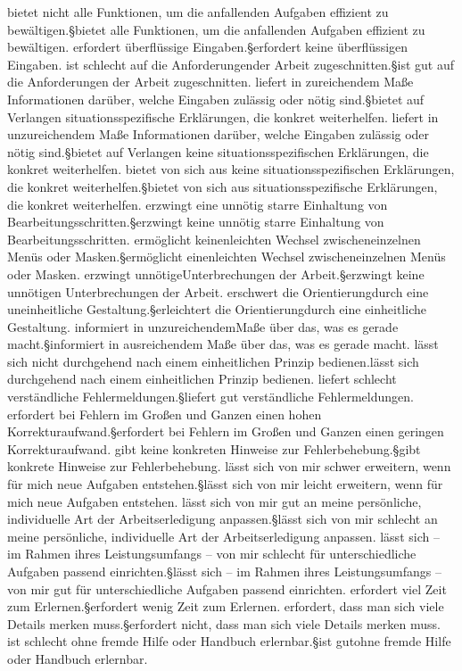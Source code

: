 bietet nicht alle Funktionen, um die anfallenden Aufgaben effizient zu bewältigen.§bietet alle Funktionen, um die anfallenden Aufgaben effizient zu bewältigen.
erfordert überflüssige Eingaben.§erfordert keine überflüssigen Eingaben.
ist schlecht auf die Anforderungender Arbeit zugeschnitten.§ist gut auf die Anforderungen der Arbeit zugeschnitten.
liefert in zureichendem Maße Informationen darüber, welche Eingaben zulässig oder nötig sind.§bietet auf Verlangen situationsspezifische Erklärungen, die konkret weiterhelfen.
liefert in unzureichendem Maße Informationen darüber, welche Eingaben zulässig oder nötig sind.§bietet auf Verlangen keine situationsspezifischen Erklärungen, die konkret weiterhelfen.
bietet von sich aus keine situationsspezifischen Erklärungen, die konkret weiterhelfen.§bietet von sich aus situationsspezifische Erklärungen, die konkret weiterhelfen.
erzwingt eine unnötig starre Einhaltung von Bearbeitungsschritten.§erzwingt keine unnötig starre Einhaltung von Bearbeitungsschritten.
ermöglicht keinenleichten Wechsel zwischeneinzelnen Menüs oder Masken.§ermöglicht einenleichten Wechsel zwischeneinzelnen Menüs oder Masken.
erzwingt unnötigeUnterbrechungen der Arbeit.§erzwingt keine unnötigen Unterbrechungen der Arbeit.
erschwert die Orientierungdurch eine uneinheitliche Gestaltung.§erleichtert die Orientierungdurch eine einheitliche Gestaltung.
informiert in unzureichendemMaße über das, was es gerade macht.§informiert in ausreichendem Maße über das, was es gerade macht.
lässt sich nicht durchgehend nach einem einheitlichen Prinzip bedienen.lässt sich durchgehend nach einem einheitlichen Prinzip bedienen.
liefert schlecht verständliche Fehlermeldungen.§liefert gut verständliche Fehlermeldungen.
erfordert bei Fehlern im Großen und Ganzen einen hohen Korrekturaufwand.§erfordert bei Fehlern im Großen und Ganzen einen geringen Korrekturaufwand.
gibt keine konkreten Hinweise zur Fehlerbehebung.§gibt konkrete Hinweise zur Fehlerbehebung.
lässt sich von mir schwer erweitern, wenn für mich neue Aufgaben entstehen.§lässt sich von mir leicht erweitern, wenn für mich neue Aufgaben entstehen.
lässt sich von mir gut an meine persönliche, individuelle Art der Arbeitserledigung anpassen.§lässt sich von mir schlecht an meine persönliche, individuelle Art der Arbeitserledigung anpassen.
lässt sich -- im Rahmen ihres Leistungsumfangs -- von mir schlecht für unterschiedliche Aufgaben passend einrichten.§lässt sich -- im Rahmen ihres Leistungsumfangs -- von mir gut für unterschiedliche Aufgaben passend einrichten.
erfordert viel Zeit zum Erlernen.§erfordert wenig Zeit zum Erlernen.
erfordert, dass man sich viele Details merken muss.§erfordert nicht, dass man sich viele Details merken muss.
ist schlecht ohne fremde Hilfe oder Handbuch erlernbar.§ist gutohne fremde Hilfe oder Handbuch erlernbar.
